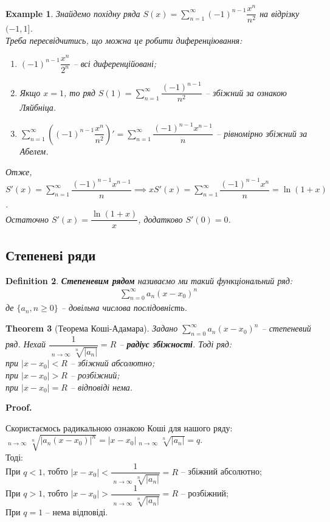 \documentclass[a4paper, 10pt]{article}
\makeatletter
\DeclareMathOperator*\uplim{\overline{lim}}
\def\huge{\displaystyle}
\def\qed{$\blacksquare$}
\theoremstyle{theoremdd}
\newtheorem{theorem}{Theorem}[subsection]
\theoremstyle{theoremdd}
\theoremstyle{theoremdd}
\newtheorem{definition}[theorem]{Definition}
\theoremstyle{theoremdd}
\theoremstyle{theoremdd}
\newtheorem{example}[theorem]{Example}
\theoremstyle{theoremdd}
\theoremstyle{theoremdd}
\theoremstyle{theoremdd}
\theoremstyle{theoremdd}
\renewenvironment{proof}[1][Proof.\\]{\par
\pushQED{\hfill \qed}%
\normalfont \topsep6\p@\@plus6\p@\relax
\trivlist
\item\relax
{\bfseries
#1\@addpunct{.}}\hspace\labelsep\ignorespaces
}{%
\popQED\endtrivlist\@endpefalse
}
\makeatother
\begin{document}
\begin{example}
Знайдемо похідну ряда $S(x) = \huge\sum_{n=1}^\infty (-1)^{n-1}\dfrac{x^n}{n^2}$ на відрізку $(-1,1]$.\\
Треба пересвідчитись, що можна це робити диференціювання:
\begin{enumerate}[nosep,wide=0pt,label={\arabic*)}]
\item $(-1)^{n-1}\dfrac{x^n}{2^n}$ -- всі диференційовані;
\item Якщо $x = 1$, то ряд $S(1) = \huge\sum_{n=1}^\infty \dfrac{(-1)^{n-1}}{n^2}$ -- збіжний за ознакою Ляйбніца.
\item $\huge\sum_{n=1}^\infty \left( (-1)^{n-1}\dfrac{x^n}{n^2} \right)' = \huge\sum_{n=1}^\infty \dfrac{(-1)^{n-1}x^{n-1}}{n}$ -- рівномірно збіжний за Абелем.
\end{enumerate}
Отже, $S'(x) = \huge\sum_{n=1}^\infty \dfrac{(-1)^{n-1} x^{n-1}}{n} \implies x S'(x) = \sum_{n=1}^\infty \dfrac{(-1)^{n-1}x^n}{n} = \ln (1+x)$.\\
Остаточно $S'(x) = \dfrac{\ln(1+x)}{x}$, додатково $S'(0) = 0$.
\end{example}

\subsection{Степеневі ряди}
\begin{definition}
\textbf{Степеневим рядом} називаємо ми такий функціональний ряд:
\begin{align*}
\sum_{n=0}^\infty a_n(x-x_0)^n
\end{align*}
де $\{a_n, n \geq 0\}$ -- довільна числова послідовність.
\end{definition}

\begin{theorem}[Теорема Коші-Адамара]
Задано $\huge \sum_{n=0}^\infty a_n(x-x_0)^n$ -- степеневий ряд. Нехай $\dfrac{1}{\huge \uplim_{n \to \infty} \sqrt[n]{|a_n|}} = R$ -- \textbf{радіус збіжності}. Тоді ряд:\\
при $|x-x_0|<R$ -- збіжний абсолютно;\\
при $|x-x_0|>R$ -- розбіжний;\\
при $|x-x_0|=R$ -- відповіді нема.
\end{theorem}

\begin{proof}
Скористаємось радикальною ознакою Коші для нашого ряду:\\
$\huge \uplim_{n \to \infty} \sqrt[n]{|a_n(x-x_0)|^n} = |x-x_0| \uplim_{n \to \infty} \sqrt[n]{|a_n|} = q$.\\
Тоді:\\
При $q < 1$, тобто $|x-x_0| < \dfrac{1}{\huge \uplim_{n \to \infty} \sqrt[n]{|a_n|}} = R$ -- збіжний абсолютно;\\
При $q > 1$, тобто $|x-x_0| > \dfrac{1}{\huge \uplim_{n \to \infty} \sqrt[n]{|a_n|}} = R$ -- розбіжний;\\
При $q = 1$ -- нема відповіді.
\end{proof}
\end{document}
